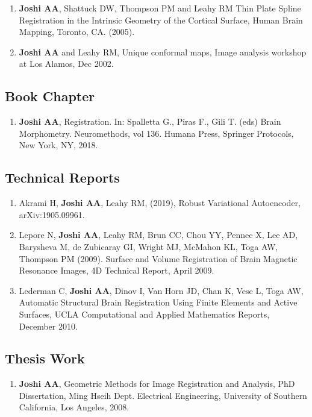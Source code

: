 \documentclass[overlapped,line,letterpaper]{res}
\begin{document}
\begin{resume}
\begin{enumerate}
    \item \textbf{Joshi AA}, Shattuck DW, Thompson PM and Leahy RM {Thin Plate Spline Registration in the Intrinsic Geometry of the Cortical Surface},  Human Brain Mapping, Toronto, CA. (2005).

    \item \textbf{Joshi AA} and Leahy RM, {Unique conformal maps},  Image analysis workshop at Los Alamos, Dec 2002. 
\end{enumerate}


\subsection{Book Chapter}
\begin{enumerate}
    \item \textbf{Joshi AA},  Registration. In: Spalletta G., Piras F., Gili T. (eds) Brain Morphometry. Neuromethods, vol 136. Humana Press, Springer Protocols, New York, NY, 2018.
\end{enumerate}


\subsection{Technical Reports}
\begin{enumerate}

    \item Akrami H, \textbf{Joshi AA}, Leahy RM, (2019), Robust Variational Autoencoder, arXiv:1905.09961.
    
    \item Lepore N, \textbf{Joshi AA}, Leahy RM, Brun CC, Chou YY, Pennec X, Lee AD, Barysheva M, de Zubicaray GI, Wright MJ, McMahon KL, Toga AW, Thompson PM (2009). Surface and Volume Registration of Brain Magnetic Resonance Images, 4D Technical Report, April 2009.

    \item Lederman C, \textbf{Joshi AA}, Dinov I, Van Horn JD, Chan K, Vese L, Toga AW, Automatic Structural Brain Registration Using Finite Elements and Active Surfaces, UCLA Computational and Applied Mathematics Reports, December 2010. 

\end{enumerate}


\subsection{Thesis Work}
\begin{enumerate}
    \item \textbf{Joshi AA}, Geometric Methods for Image Registration and Analysis, PhD Dissertation, Ming Hseih Dept. Electrical Engineering, University of Southern California, Los Angeles, 2008.


\end{enumerate}
\end{resume}
\end{document}
